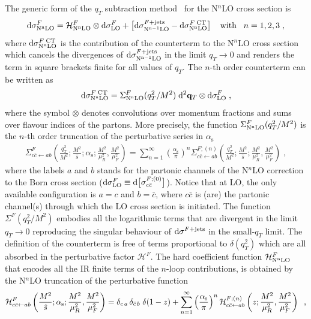 \documentclass[12pt]{article}
\def\beeq{\begin{eqnarray}}
\def\eeeq{\end{eqnarray}}
\DeclareRobustCommand{\as}{\ensuremath{\alpha_{\mathrm{s}}}}
\newcommand\f[2]{\frac{#1}{#2}}
\def\ito{\leftarrow}
\DeclareRobustCommand{\qt}{q_T}
\DeclareRobustCommand{\rd}{\ensuremath{\mathrm{d}}}
\begin{document}
The generic form of the $\qt$ subtraction method~\cite{Catani:2007vq} for the N$^{n}$LO cross section is
 \begin{equation}
 \label{masterEqqT}
 \rd\sigma^{F}_{\rm N^{n}LO} = \mathcal{H}^{F}_{\rm N^{n}LO} \otimes \rd\sigma^{F}_{\rm LO} + \big[ \rd\sigma^{F+{\rm jets}}_{\rm N^{n-1}LO} -  \rd\sigma^{F\;{\rm CT}}_{\rm N^{n}LO} \big]\;\;\;\;{\rm with}\;\;\; n=1,2,3\;,
 \end{equation}
where $\rd\sigma^{F\;{\rm CT}}_{\rm N^{n}LO}$ is the contribution of the counterterm to the N$^{n}$LO cross section which cancels the divergences of $\rd\sigma^{F+{\rm jets}}_{\rm N^{n-1}LO}$ in the limit $\qt \rightarrow 0$ and renders the term in square brackets finite for all values of $\qt$. 
The $n$-th order counterterm can be written as
\begin{equation}
  \rd\sigma^{F\;{\rm CT}}_{\rm N^{n}LO} =   \Sigma^{F}_{\rm N^{n}LO}(\qt^{2}/M^{2})\;\rd^{2}\mathbf{q}_{T}   \otimes \rd\sigma^{F}_{\rm LO}\;,
\end{equation}
where the symbol $ \otimes$ denotes convolutions over momentum fractions and sums over flavour indices of the partons.
More precisely, the function $\Sigma^{F}_{\rm N^{n}LO}(\qt^{2}/M^{2})$ is the $n$-th order truncation of the perturbative series in $\as$
\beeq
\Sigma^{F}_{c\bar{c}\leftarrow ab}\left(\f{\qt^{2}}{M^{2}};\f{M^2}{\hat s};\as;
\f{M^2}{\mu_R^2},\f{M^2}{\mu_F^2}\right)=  \sum_{n=1}^\infty \left( \frac{\as}{\pi} \right)^n \Sigma^{F;(n)}_{c\bar{c}\leftarrow ab}\left(\f{\qt^{2}}{M^{2}};\f{M^2}{\hat s};
\f{M^2}{\mu_R^2},\f{M^2}{\mu_F^2}\right)\;,
\label{eq:sigexpansion}
\eeeq
where the labels $a$ and $b$ stands for the partonic channels of the N$^{n}$LO correction to the Born cross section ($\rd\sigma^{F}_{\rm LO}\equiv \rd\big[\sigma^{F;(0)}_{c\bar{c}}\big]$). Notice that at LO, the only available configuration is $a=c$ and $b=\bar{c}$, where $c\bar{c}$ is (are) the partonic channel(s) through which the LO cross section is initiated.
The function $ \Sigma^{F}(\qt^{2}/M^{2})$ embodies all the logarithmic terms that are divergent in the limit $\qt \rightarrow 0$ reproducing the singular behaviour of  $\rd\sigma^{F+{\rm jets}}$ in the small-$\qt$ limit. The definition of the counterterm is free of terms proportional to $\delta(\qt^{2})$ which are all absorbed in the perturbative factor $\mathcal{H}^{F}$. The hard coefficient function $\mathcal{H}^{F}_{\rm N^{n}LO}$  that encodes all the IR finite terms of the $n$-loop contributions, is obtained by the N$^{n}$LO truncation of the perturbative function
\begin{equation}
\label{Hstexpand}
{\cal H}^F_{c\bar{c}\ito ab}\left(\f{M^2}{\hat s};\as;
\f{M^2}{\mu_R^2},\f{M^2}{\mu_F^2}\right)=\delta_{c\,a} \,\delta_{\bar{c}\,b}\;\delta(1-z)+
\sum_{n=1}^{\infty}\left(\frac{\as}{\pi}\right)^n 
{\cal H}^{F;(n)}_{c\bar{c}\ito ab}\left(z;
\f{M^2}{\mu_R^2},\f{M^2}{\mu_F^2}\right)\;\; ,
\end{equation}
\end{document}

